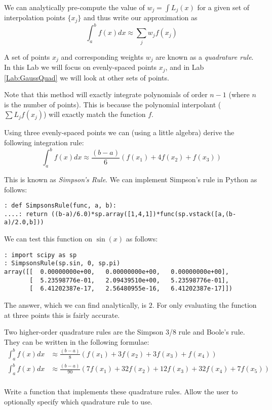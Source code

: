We can analytically pre-compute the value of $w_j = \int L_j(x)$ for a given set of interpolation points $\{x_j\}$ and thus write our approximation as
\[
\int_a^b f(x) dx \approx \sum_j w_j f(x_j)
\]

A set of points $x_j$ and corresponding weights $w_j$ are known as a \emph{quadrature rule}. In this Lab we will focus on evenly-spaced points $x_j$, and in Lab \ref{Lab:GaussQuad} we will look at other sets of points.

Note that this method will exactly integrate polynomials of order $n-1$ (where $n$ is the number of points). This is because the polynomial interpolant ($\sum L_j f(x_j)$) will exactly match the function $f$.

Using three evenly-spaced points we can (using a little algebra) derive the following integration rule:
\[
\int_a^b f(x) dx \approx \frac{(b-a)}{6}\left(f(x_1) + 4 f(x_2) + f(x_3)\right)
\]

This is known as \emph{Simpson's Rule}. We can implement Simpson's rule in Python as follows:
\begin{lstlisting}
: def SimpsonsRule(func, a, b):
....: return ((b-a)/6.0)*sp.array([1,4,1])*func(sp.vstack([a,(b-a)/2.0,b]))
\end{lstlisting}


We can test this function on $\sin(x)$ as follows:
\begin{lstlisting}
: import scipy as sp
: SimpsonsRule(sp.sin, 0, sp.pi)
array([[  0.00000000e+00,   0.00000000e+00,   0.00000000e+00],
       [  5.23598776e-01,   2.09439510e+00,   5.23598776e-01],
       [  6.41202387e-17,   2.56480955e-16,   6.41202387e-17]])
\end{lstlisting}


The answer, which we can find analytically, is $2$. For only evaluating the function at three points this is fairly accurate.

\begin{problem}
Two higher-order quadrature rules are the Simpson 3/8 rule and Boole's rule. They can be written in the following formulae:
\begin{align*}
\int_a^b f(x) dx &\approx \frac{(b-a)}{8}\left(f(x_1) + 3 f(x_2) + 3 f(x_3) + f(x_4)\right) \\
\int_a^b f(x) dx &\approx \frac{(b-a)}{90}\left(7f(x_1) + 32 f(x_2) + 12 f(x_3) + 32f(x_4) + 7 f(x_5)\right) \\
\end{align*}

Write a function that implements these quadrature rules. Allow the user to optionally specify which quadrature rule to use.
\end{problem}

